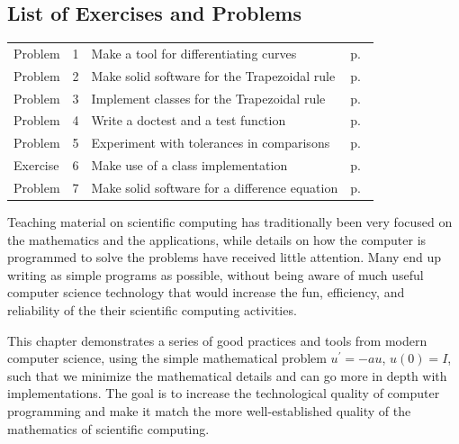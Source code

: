 \documentclass[%
oneside,                 %
final,                   %
10pt]{article}
\begin{document}
\subsection*{List of Exercises and Problems}
\begin{tabular}{lrll}
Problem & 1 & Make a tool for differentiating curves & p.~\pageref{softeng1:exer:derivative} \\
Problem & 2 & Make solid software for the Trapezoidal rule & p.~\pageref{softeng1:exer:integral:flat} \\
Problem & 3 & Implement classes for the Trapezoidal rule & p.~\pageref{softeng1:exer:integral:flat2} \\
Problem & 4 & Write a doctest and a test function & p.~\pageref{softeng1:exer:doctest1} \\
Problem & 5 & Experiment with tolerances in comparisons & p.~\pageref{softeng1:exer:tol} \\
Exercise & 6 & Make use of a class implementation & p.~\pageref{softeng1:exer:class:dts} \\
Problem & 7 & Make solid software for a difference equation & p.~\pageref{softeng1:exer:logistic} \\
\end{tabular}
\clearpage %




\vspace{1cm} %








Teaching material on scientific computing has traditionally been very
focused on the mathematics and the applications, while details on how
the computer is programmed to solve the problems have received little attention.
Many end up writing as simple programs as possible, without being
aware of much useful computer science technology that would increase
the fun, efficiency, and reliability of the their scientific computing
activities.

This chapter demonstrates a series of good practices and tools
from modern computer science, using the simple mathematical problem
$u^{\prime}=-au$, $u(0)=I$, such that we minimize the
mathematical details and can go more in depth with implementations.
The goal is to increase the technological
quality of computer programming and make it match the more
well-established quality of the mathematics of scientific computing.
\end{document}
